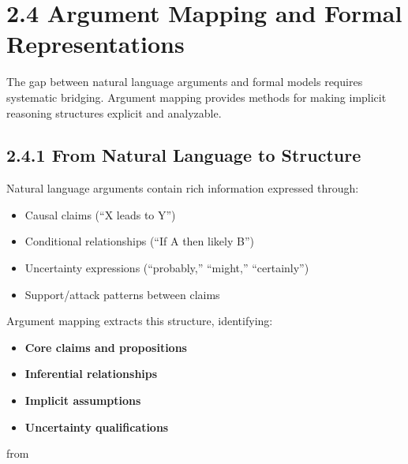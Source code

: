 \documentclass[
  11pt,
  letterpaper,
]{book}
\providecommand{\tightlist}{%
  \setlength{\itemsep}{0pt}\setlength{\parskip}{0pt}}
\begin{document}
\section*{2.4 Argument Mapping and Formal
Representations}\label{sec-argument-mapping}


The gap between natural language arguments and formal models requires
systematic bridging. Argument mapping provides methods for making
implicit reasoning structures explicit and analyzable.

\subsection*{2.4.1 From Natural Language to
Structure}\label{sec-natural-to-structure}

Natural language arguments contain rich information expressed through:

\begin{itemize}
\tightlist
\item
  Causal claims (``X leads to Y'')
\item
  Conditional relationships (``If A then likely B'')
\item
  Uncertainty expressions (``probably,'' ``might,'' ``certainly'')
\item
  Support/attack patterns between claims
\end{itemize}

Argument mapping extracts this structure, identifying:

\begin{itemize}
\tightlist
\item
  \textbf{Core claims and propositions}
\item
  \textbf{Inferential relationships}
\item
  \textbf{Implicit assumptions}
\item
  \textbf{Uncertainty qualifications}
\end{itemize}

from \textcite{metropolitansky2025}
\end{document}
